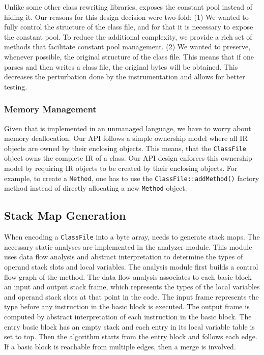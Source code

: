 Unlike some other class rewriting libraries, \jnif{} exposes the constant pool instead of hiding it.
Our reasons for this design decision were two-fold:
(1) We wanted to fully control the structure of the class file, 
and for that it is necessary to expose the constant pool. 
To reduce the additional complexity, we provide a rich set of methods that facilitate constant pool management. 
(2) We wanted to preserve, whenever possible, the original structure of the class file. 
This means that if one parses and then writes a class file, 
the original bytes will be obtained. 
This decreases the perturbation done by the instrumentation and allows for better testing.


\subsubsection*{Memory Management}

Given that \jnif{} is implemented in an unmanaged language,
we have to worry about memory deallocation.
Our API follows a simple ownership model
where all IR objects are owned by their enclosing objects.
This means, that the \texttt{ClassFile} object owns the complete IR of a class.
Our API design enforces this ownership model
by requiring IR objects to be created by their enclosing objects.
For example, to create a \texttt{Method}, 
one has to use the \texttt{ClassFile::addMethod()} factory method
instead of directly allocating a new \texttt{Method} object.


\subsection{Stack Map Generation}

When encoding a \texttt{ClassFile} into a byte array, \jnif{} needs to generate stack maps.
The necessary static analyses are implemented in the analyzer module.
This module uses data flow analysis and abstract interpretation to determine the types of operand stack slots and local variables.
The analysis module first builds a control flow graph of the method.
The data flow analysis associates to each basic block an input and output stack frame, 
which represents the types of the local variables and operand stack slots at that point in the code.
The input frame represents the type before any instruction in the basic block is executed.
The output frame is computed by abstract interpretation of each instruction in the basic block.
The entry basic block has an empty stack and each entry in its local variable table is set to top.
Then the algorithm starts from the entry block and follows each edge.
If a basic block is reachable from multiple edges, then a merge is involved.

